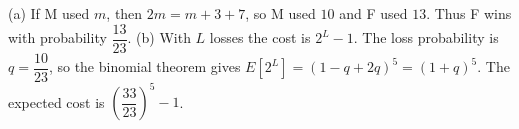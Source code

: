 (a) If M used $m$, then $2m=m+3+7$, so M used $10$ and F used $13$. Thus F wins with probability $\boxed{\dfrac{13}{23}}$. (b) With $L$ losses the cost is $2^L-1$. The loss probability is $q=\dfrac{10}{23}$, so the binomial theorem gives $E[2^L]=(1-q+2q)^5=(1+q)^5$. The expected cost is $\boxed{(\dfrac{33}{23})^5-1}$.
